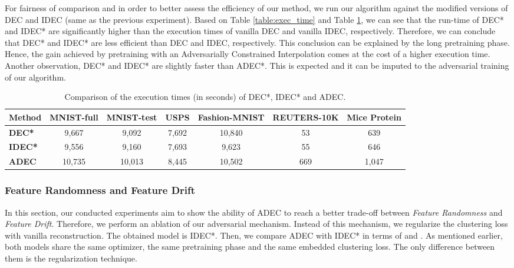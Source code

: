 \documentclass{article}
\begin{document}
For fairness of comparison and in order to better assess the efficiency of our method, we run our algorithm against the modified versions of DEC and IDEC (same as the previous experiment). Based on Table \ref{table:exec_time} and Table \ref{table:fair_exec_time}, we can see that the run-time of DEC* and IDEC* are significantly higher than the execution times of vanilla DEC and vanilla IDEC, respectively. Therefore, we can conclude that DEC* and IDEC* are less efficient than DEC and IDEC, respectively. This conclusion can be explained by the long pretraining phase. Hence, the gain achieved by pretraining with an Adversarially Constrained Interpolation comes at the cost of a higher execution time. Another observation, DEC* and IDEC* are slightly faster than ADEC*. This is expected and it can be imputed to the adversarial training of our algorithm.

\begin{table}
  \caption{Comparison of the execution times (in seconds) of DEC*, IDEC* and ADEC.}
  \vskip 0.15in
  \begin{center}
  \begin{small}
  \begin{tabular}{|p{2.2cm}|c|c|c|c|c|c|}
    \hline
    {\textbf{Method}} & {\textbf{MNIST-full}} & {\textbf{MNIST-test}} & {\textbf{USPS}} &{\textbf{Fashion-MNIST}} & {\textbf{REUTERS-10K}}& {\textbf{Mice Protein}} \\ \hline
    \textbf{DEC*} & 9,667 & 9,092 & 7,692 & 10,840 & 53  & 639 \\ \hline
    \textbf{IDEC*} & 9,556 & 9,160 & 7,693 & 9,623 & 55  & 646 \\ \hline
    \textbf{ADEC} & 10,735 & 10,013 & 8,445 & 10,502 & 669  & 1,047 \\ \hline 
  \end{tabular}
  \label{table:fair_exec_time}
  \end{small}
  \end{center}
  \vskip -0.1in
\end{table}

\subsubsection{Feature Randomness and Feature Drift}
\label{Sec:Feature Randomness and Feature Drift}

In this section, our conducted experiments aim to show the ability of ADEC to reach a better trade-off between \textit{Feature Randomness} and \textit{Feature Drift}. Therefore, we perform an ablation of our adversarial mechanism. Instead of this mechanism, we regularize the clustering loss with vanilla reconstruction. The obtained model is IDEC*. Then, we compare ADEC with IDEC* in terms of  and . As mentioned earlier, both models share the same optimizer, the same pretraining phase and the same embedded clustering loss. The only difference between them is the regularization technique. 
\end{document}
